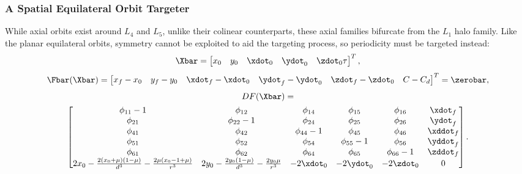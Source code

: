 \subsubsection{A Spatial Equilateral Orbit Targeter}
While axial orbits exist around $L_{4}$ and $L_{5}$, unlike their colinear counterparts, these
axial families bifurcate from the $L_{1}$ halo family. Like the planar equilateral orbits, symmetry
cannot be exploited to aid the targeting process, so periodicity must be targeted instead:
\begin{equation}
    \Xbar=\begin{bmatrix}   x_{0}   &   y_{0}   &   \xdot_{0}   &   \ydot_{0}   &   \zdot_{0}   \tau    \end{bmatrix}^{T},
    \label{eq:eqaxialfreevar}
\end{equation}
\begin{equation}
    \Fbar(\Xbar)=\begin{bmatrix}    x_{f}-x_{0} &   y_{f}-y_{0} &   \xdot_{f}-\xdot_{0} &   \ydot_{f}-\ydot_{0} &   \zdot_{f}-\zdot_{0} &   C-C_{d} \end{bmatrix}^{T}=\zerobar,
    \label{eq:eqaxialconst}
\end{equation}
\begin{multline}
    DF(\Xbar)=\\
    \begin{bmatrix} \phi_{11}-1                                                                 &   \phi_{12}                                                   &   \phi_{14}   &   \phi_{15}   &   \phi_{16}   &   \xdot_{f}   \\
                    \phi_{21}                                                                   &   \phi_{22}-1                                                 &   \phi_{24}   &   \phi_{25}   &   \phi_{26}   &   \ydot_{f}   \\
                    \phi_{41}                                                                   &   \phi_{42}                                                   &   \phi_{44}-1 &   \phi_{45}   &   \phi_{46}   &   \xddot_{f}  \\
                    \phi_{51}                                                                   &   \phi_{52}                                                   &   \phi_{54}   &   \phi_{55}-1 &   \phi_{56}   &   \yddot_{f}  \\
                    \phi_{61}                                                                   &   \phi_{62}                                                   &   \phi_{64}   &   \phi_{65}   &   \phi_{66}-1 &   \zddot_{f}  \\
                    2x_{0}-\frac{2(x_{0}+\mu)(1-\mu)}{d^{3}}-\frac{2\mu(x_{0}-1+\mu)}{r^{3}}    &   2y_{0}-\frac{2y_{0}(1-\mu)}{d^{3}}-\frac{2y_{0}\mu}{r^{3}}  &   -2\xdot_{0} &   -2\ydot_{0} &   -2\zdot_{0} &   0           \end{bmatrix}.
    \label{eq:eqaxialjacobian}
\end{multline}


